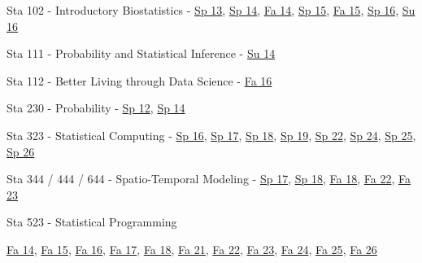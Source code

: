 \documentclass[margin,line]{res}
\begin{document}
\begin{resume}
\begin{list1}
\item[] Sta 102 - Introductory Biostatistics - \href{http://www2.stat.duke.edu/courses/Spring13/sta102.001/}{Sp 13}, \href{https://stat.duke.edu/~cr173/Sta102_Sp14/}{Sp 14}, \href{https://stat.duke.edu/~cr173/Sta102_Fa14/}{Fa 14}, \href{https://stat.duke.edu/~cr173/Sta102_Sp15/}{Sp 15}, \href{https://stat.duke.edu/~cr173/Sta102_Fa15/}{Fa 15}, \href{http://stat.duke.edu/~cr173/Sta102_Sp16/}{Sp 16}, \href{http://stat.duke.edu/~cr173/Sta102_Su16/}{Su 16}

\item[] Sta 111 - Probability and Statistical Inference - \href{https://stat.duke.edu/~cr173/Sta111_Su14/}{Su 14}

\item[] Sta 112 - Better Living through Data Science - \href{http://stat.duke.edu/~cr173/Sta112_Fa16/}{Fa 16}

\item[] Sta 230 - Probability - \href{http://www2.stat.duke.edu/courses/Spring12/sta104.1/}{Sp 12}, \href{https://stat.duke.edu/~cr173/Sta230_Sp14/}{Sp 14}

\item[] Sta 323 - Statistical Computing - \href{http://stat.duke.edu/~cr173/Sta323_Sp16/}{Sp 16}, \href{http://stat.duke.edu/~cr173/Sta323_Sp17/}{Sp 17}, \href{http://stat.duke.edu/~cr173/Sta323_Sp18/}{Sp 18}, \href{http://stat.duke.edu/~cr173/Sta323_Sp19/}{Sp 19}, \href{https://sta323-sp22.github.io/}{Sp 22}, \href{https://sta323-sp24.github.io/}{Sp 24}, \href{https://sta323-sp25.github.io/}{Sp 25}, \href{https://sta323-sp26.github.io/}{Sp 26}

\item[] Sta 344 / 444 / 644 - Spatio-Temporal Modeling - \href{http://stat.duke.edu/~cr173/Sta444_Sp17/}{Sp 17}, \href{http://stat.duke.edu/~cr173/Sta444_Sp18/}{Sp 18}, \href{http://stat.duke.edu/~cr173/Sta444_Fa18/}{Fa 18}, \href{https://sta344-fa22.github.io/}{Fa 22}, \href{https://sta344-644-fa23.github.io/}{Fa 23}

\item[] Sta 523 - Statistical Programming
\begin{list1}
\item[] \href{https://stat.duke.edu/~cr173/Sta523_Fa14/}{Fa 14}, \href{https://stat.duke.edu/~cr173/Sta523_Fa15/}{Fa 15}, \href{https://stat.duke.edu/~cr173/Sta523_Fa16/}{Fa 16}, \href{https://stat.duke.edu/~cr173/Sta523_Fa17/}{Fa 17}, \href{https://stat.duke.edu/~cr173/Sta523_Fa18/}{Fa 18},
\href{https://sta523-fa21.github.io/}{Fa 21}, \href{https://sta523-fa22.github.io/}{Fa 22}, \href{https://sta523-fa23.github.io/}{Fa 23}, \href{https://sta523-fa24.github.io/}{Fa 24}, \href{https://sta523-fa25.github.io/}{Fa 25}, \href{https://sta523-fa26.github.io/}{Fa 26}
\end{list1}


\end{list1}
\end{resume}
\end{document}
